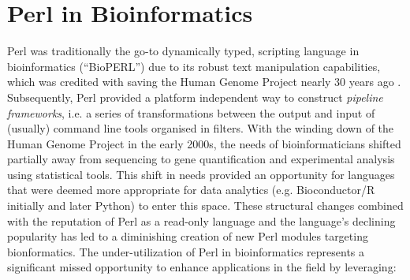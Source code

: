 \documentclass[10pt]{article}
\begin{document}
\section{Perl in Bioinformatics}
Perl was traditionally the go-to dynamically typed, scripting language in bioinformatics (“BioPERL”) due to its robust text manipulation capabilities, which was credited with saving the Human Genome Project nearly 30 years ago \cite{stein_how_1996}. Subsequently, Perl provided a platform independent way to construct \textit{pipeline frameworks}, i.e. a series of transformations between the output and input of (usually) command line tools organised in filters\cite{leipzig_review_2017}. With the winding down of the Human Genome Project in the early 2000s, the needs of bioinformaticians shifted partially away from sequencing to gene quantification and experimental analysis using statistical tools. This shift in needs provided an opportunity for languages that were deemed more appropriate for data analytics (e.g. Bioconductor/R initially and later Python) to enter this space. These structural changes combined with the reputation of Perl as a read-only language and the language's  declining  popularity has led to a diminishing creation of new Perl modules targeting bionformatics. The under-utilization of Perl in bioinformatics represents a significant missed opportunity to enhance applications in the field by leveraging: 
\end{document}
